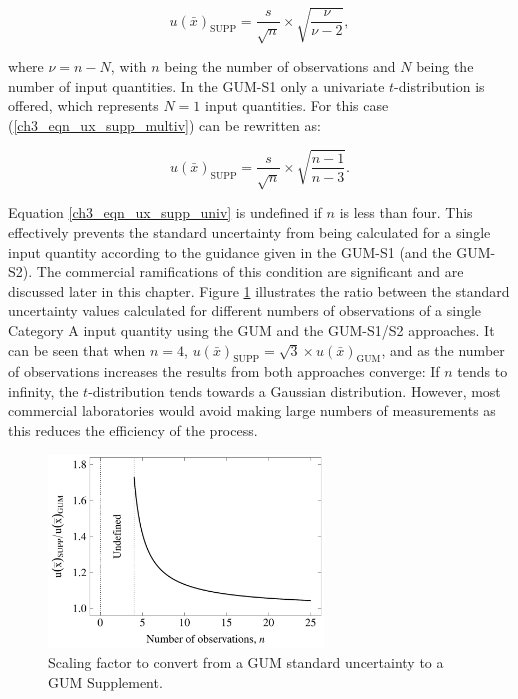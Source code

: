 \documentclass[../thesis/thesis.tex]{subfiles}
\begin{document}
\begin{refsection}
\begin{equation}
u(\bar{x})_{\textrm{SUPP}} = \frac{s}{\sqrt{n}} \times \sqrt{\frac{\nu}{\nu-2}},
\label{ch3_eqn_ux_supp_multiv}
\end{equation}

where $\nu=n-N$, with $n$ being the number of observations and $N$ being the number of input quantities. In the GUM-S1 only a univariate $t$-distribution is offered, which represents $N=1$ input quantities. For this case (\ref{ch3_eqn_ux_supp_multiv}) can be rewritten as:

\begin{equation}
u(\bar{x})_{\textrm{SUPP}} = \frac{s}{\sqrt{n}} \times \sqrt{\frac{n-1}{n-3}}.
\label{ch3_eqn_ux_supp_univ}
\end{equation}

Equation \ref{ch3_eqn_ux_supp_univ} is undefined if $n$ is less than four. This effectively prevents the standard uncertainty from being calculated for a single input quantity according to the guidance given in the GUM-S1 (and the GUM-S2). The commercial ramifications of this condition are significant and are discussed later in this chapter. Figure \ref{ch3_fig_scaling_factor} illustrates the ratio between the standard uncertainty values calculated for different numbers of observations of a single Category A input quantity using the GUM and the GUM-S1/S2 approaches. It can be seen that when $n = 4$, $u(\bar{x})_{\textrm{SUPP}} = \sqrt{3} \times u(\bar{x})_{\textrm{GUM}}$, and as the number of observations increases the results from both approaches converge: If $n$ tends to infinity, the $t$-distribution tends towards a Gaussian distribution. However, most commercial laboratories would avoid making large numbers of measurements as this reduces the efficiency of the process.

\begin{figure}
	\centering
	\includegraphics[width=0.65\textwidth]{scaling_factor}
	\caption{Scaling factor to convert from a GUM standard uncertainty to a GUM Supplement.}
	\label{ch3_fig_scaling_factor}
\end{figure}


\end{refsection}
\end{document}
